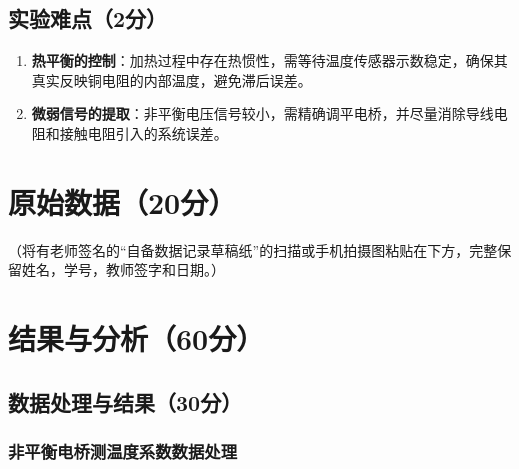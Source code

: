\documentclass{../../templates/Report}%
\begin{document}
\subsection{实验难点（2分）}
\begin{enumerate}
    \item \textbf{热平衡的控制}：加热过程中存在热惯性，需等待温度传感器示数稳定，确保其真实反映铜电阻的内部温度，避免滞后误差。
    \item \textbf{微弱信号的提取}：非平衡电压信号较小，需精确调平电桥，并尽量消除导线电阻和接触电阻引入的系统误差。
\end{enumerate}

\begin{fullreportonly}
    \section{原始数据（20分）}
    （将有老师签名的“自备数据记录草稿纸”的扫描或手机拍摄图粘贴在下方，完整保留姓名，学号，教师签字和日期。）

    \section{结果与分析（60分）}

    \subsection{数据处理与结果（30分）}

    \subsubsection{非平衡电桥测温度系数数据处理}


\end{fullreportonly}
\end{document}
